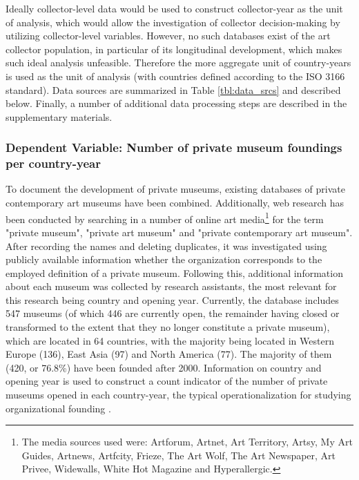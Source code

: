 \documentclass[11pt]{article}
\begin{document}
Ideally collector-level data would be used to construct collector-year as the unit of analysis, which would allow the investigation of collector decision-making by utilizing collector-level variables. 
However, no such databases exist of the art collector population, in particular of its longitudinal development, which makes such ideal analysis unfeasible. 
Therefore the more aggregate unit of country-years is used as the unit of analysis (with countries defined according to the ISO 3166 standard). 
Data sources are summarized in Table \ref{tbl:data_srcs} and described below.
Finally, a number of additional data processing steps are described in the supplementary materials.


\subsubsection*{Dependent Variable: Number of private museum foundings per country-year}


To document the development of private museums, existing databases of private contemporary art museums \parencite{LarrysList_2015_report,Independent_collectors,global_private_museum_network_2020_museums,BMW_Independent_Collectors_2018_artguide,vdEerenbeemt_vdWauw_DDD_2016} have been combined.
Additionally, web research has been conducted by searching in a number of online art media\footnote{The media sources used were: Artforum, Artnet, Art Territory, Artsy, My Art Guides, Artnews, Artfcity, Frieze, The Art Wolf, The Art Newspaper, Art Privee, Widewalls, White Hot Magazine and Hyperallergic.} for the term "private museum", "private art museum" and "private contemporary art museum".
After recording the names and deleting duplicates, it was investigated using publicly available information whether the organization corresponds to the employed definition of a private museum.
Following this, additional information about each museum was collected by research assistants, the most relevant for this research being country and opening year.
Currently, the database includes 547 museums (of which 446 are currently open, the remainder having closed or transformed to the extent that they no longer constitute a private museum), which are located in 64 countries, with the majority being located in Western Europe (136), East Asia (97) and North America (77).
The majority of them (420, or 76.8\%) have been founded after 2000.
Information on country and opening year is used to construct a count indicator of the number of private museums opened in each country-year, the typical operationalization for studying organizational founding \parencite{Bogaert_etal_2014_ecological}.
\end{document}
